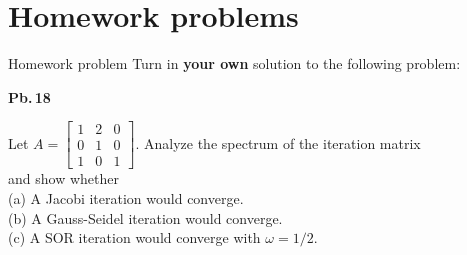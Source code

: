 \documentclass[t,usepdftitle=false]{beamer}
\begin{document}
\section{Homework problems}

\begin{frame}{Homework problem}\vspace{.1cm}
Turn in \textbf{your own} solution to the following problem:\vspace{.15cm}\\
\begin{minipage}[t]{0.1\textwidth}
\textbf{Pb.$\,$18}
\end{minipage}
\begin{minipage}[t]{0.89\textwidth}
Let $A=\begin{bmatrix}1&2&0\\0&1&0\\1&0&1\end{bmatrix}$.
Analyze the spectrum of the iteration matrix\vspace{.4cm}\\
and show whether\vspace{.4cm}\\
(a) A Jacobi iteration would converge.\vspace{.1cm}\\
(b) A Gauss-Seidel iteration would converge.\vspace{.1cm}\\
(c) A SOR iteration would converge with $\omega=1/2$.
\end{minipage}\vspace{.15cm}
\end{frame}
\end{document}
